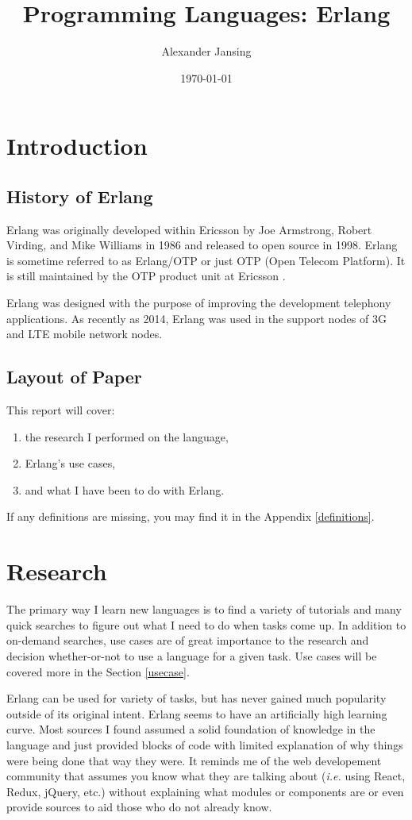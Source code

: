 \documentclass[11 pt]{IEEEtran}
\title{Programming Languages: Erlang}
\author{Alexander Jansing}
\date{\today}
\begin{document}
\maketitle


\section{Introduction}
\subsection{History of Erlang}
Erlang was originally developed within Ericsson by Joe Armstrong, Robert Virding, and Mike Williams in 1986 and released to open source in 1998. Erlang is sometime referred to as Erlang/OTP or just OTP (Open Telecom Platform). It is still maintained by the OTP product unit at Ericsson \cite{wiki}. 

Erlang was designed with the purpose of improving the development telephony applications. As recently as 2014, Erlang was used in the support nodes of 3G and LTE mobile network nodes\cite{wiki}\cite{inside-erlang}.

\subsection{Layout of Paper}
This report will cover:
\begin{enumerate}
    \item the research I performed on the language,
    \item Erlang's use cases,
    \item and what I have been to do with Erlang.
\end{enumerate}

If any definitions are missing, you may find it in the Appendix \ref{definitions}.

\section{Research}
The primary way I learn new languages is to find a variety of tutorials and many quick searches to figure out what I need to do when tasks come up. In addition to on-demand searches, use cases are of great importance to the research and decision whether-or-not to use a language for a given task. Use cases will be covered more in the Section \ref{usecase}.

Erlang can be used for variety of tasks, but has never gained much popularity outside of its original intent. Erlang seems to have an artificially high learning curve. Most sources I found assumed a solid foundation of knowledge in the language and just provided blocks of code with limited explanation of why things were being done that way they were. It reminds me of the web developement community that assumes you know what they are talking about (\emph{i.e.} using React, Redux, jQuery, etc.) without explaining what modules or components are or even provide sources to aid those who do not already know.
\end{document}

